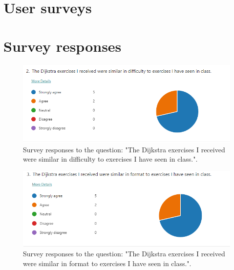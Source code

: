 \documentclass{l4proj}
\begin{document}
\begin{appendices}



\chapter{User surveys}
\label{chap:user_surveys}




\chapter{Survey responses}
\label{sec:survey_responses}
\begin{figure}[h]
    \centering
    \includegraphics[width=0.9\linewidth]{images/d_similar_difficulty.png}    

    \caption{Survey responses to the question: "The Dijkstra exercises I received were similar in difficulty to exercises I have seen in class.".}
    \label{fig:d_similar_difficulty} 
\end{figure}

\begin{figure}[h]
    \centering
    \includegraphics[width=0.9\linewidth]{images/d_similar_format.png}    

    \caption{Survey responses to the question: "The Dijkstra exercises I received were similar in format to exercises I have seen in class.".}
    \label{fig:d_similar_format} 
\end{figure}


\end{appendices}
\end{document}
